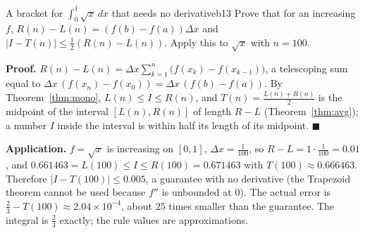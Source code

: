 \documentclass[11pt]{article}
\begin{document}
\begin{exmp}{A bracket for $\int_0^1\sqrt x\,dx$ that needs no derivative}{b13}
Prove that for an increasing $f$, $R(n)-L(n)=(f(b)-f(a))\Delta x$ and $\lvert I-T(n)\rvert\le\frac12(R(n)-L(n))$. Apply this to $\sqrt x$ with $n=100$.

\textbf{Proof.} $R(n)-L(n)=\Delta x\sum_{k=1}^n\bigl(f(x_k)-f(x_{k-1})\bigr)$, a telescoping sum equal to $\Delta x\,(f(x_n)-f(x_0))=\Delta x\,(f(b)-f(a))$. By Theorem~\ref{thm:mono}, $L(n)\le I\le R(n)$, and $T(n)=\frac{L(n)+R(n)}2$ is the midpoint of the interval $[L(n),R(n)]$ of length $R-L$ (Theorem~\ref{thm:avg}); a number $I$ inside the interval is within half its length of its midpoint. $\blacksquare$

\textbf{Application.} $f=\sqrt x$ is increasing on $[0,1]$, $\Delta x=\frac1{100}$, so $R-L=1\cdot\frac1{100}=0.01$, and $0.661463=L(100)\le I\le R(100)=0.671463$ with $T(100)\approx0.666463$. Therefore $\lvert I-T(100)\rvert\le0.005$, a guarantee with no derivative (the Trapezoid theorem cannot be used because $f''$ is unbounded at $0$). The actual error is $\frac23-T(100)\approx2.04\times10^{-4}$, about $25$ times smaller than the guarantee. The integral is $\frac23$ exactly; the rule values are approximations.
\end{exmp}
\end{document}
